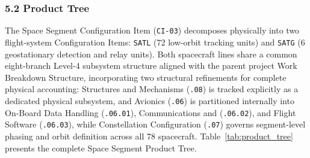 \subsubsection{5.2 Product Tree}

The Space Segment Configuration Item (\texttt{CI-03}) decomposes physically into two flight-system Configuration Items: \texttt{SATL} (72 low-orbit tracking units) and \texttt{SATG} (6 geostationary detection and relay units). Both spacecraft lines share a common eight-branch Level-4 subsystem structure aligned with the parent project Work Breakdown Structure, incorporating two structural refinements for complete physical accounting: Structures and Mechanisms (\texttt{.08}) is tracked explicitly as a dedicated physical subsystem, and Avionics (\texttt{.06}) is partitioned internally into On-Board Data Handling (\texttt{.06.01}), Communications and  (\texttt{.06.02}), and Flight Software (\texttt{.06.03}), while Constellation Configuration (\texttt{.07}) governs segment-level phasing and orbit definition across all 78 spacecraft. Table~\ref{tab:product_tree} presents the complete Space Segment Product Tree.

